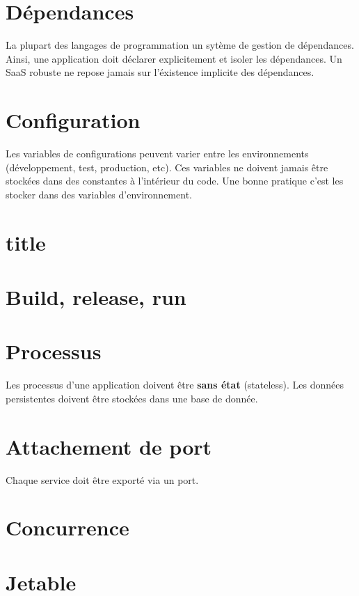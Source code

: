 \section*{Dépendances}

La plupart des langages de programmation un sytème de gestion de dépendances. Ainsi, une application doit déclarer explicitement et isoler les dépendances. Un SaaS robuste ne repose jamais sur l'éxistence implicite des dépendances. 

\section*{Configuration}

Les variables de configurations peuvent varier entre les environnements (développement, test, production, etc). Ces variables ne doivent jamais être stockées dans des constantes à l'intérieur du code. Une bonne pratique c'est les stocker dans des variables d'environnement.

\section*{title}



\section*{Build, release, run}
\section*{Processus}

Les processus d'une application doivent être \textbf{sans état} (stateless). Les données persistentes doivent être stockées dans une base de donnée.

\section*{Attachement de port}

Chaque service doit être exporté via un port.

\section*{Concurrence}


\section*{Jetable}


